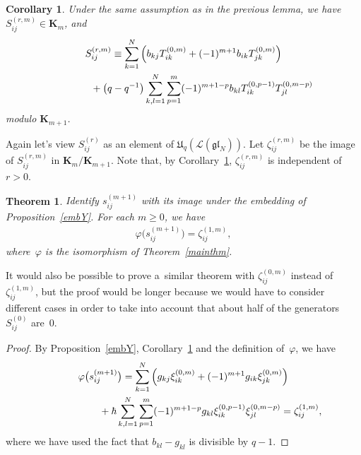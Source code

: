 \documentclass[11pt]{article}
\newtheorem{theorem}{Theorem}
\newtheorem{corollary}{Corollary}
\numberwithin{theorem}{section}
\numberwithin{proposition}{section}
\numberwithin{lemma}{section}
\numberwithin{corollary}{section}
\numberwithin{definition}{section}
\numberwithin{example}{section}
\numberwithin{remark}{section}
\numberwithin{note}{section}
\numberwithin{equation}{section}
\begin{document}
\begin{corollary}
\label{Scong}
Under the same assumption as in the previous lemma, we have $S_{ij}^{(r,m)} \in \mathbf{K}_m$, and
\begin{gather*}
S_{ij}^{(r,m)} \equiv \sum\limits_{k=1}^N \left(b_{kj}T_{ik}^{(0,m)} + (-1)^{m+1} b_{ik} T_{jk}^{(0,m)}\right) \\
\hphantom{S_{ij}^{(r,m)} \equiv}{}
+
\big(q-q^{-1}\big) \sum\limits_{k,l=1}^N \sum\limits_{p=1}^m (-1)^{m+1-p} b_{kl} T_{ik}^{(0,p-1)} T_{jl}^{(0,m-p)}
\end{gather*}
modulo $\mathbf{K}_{m+1}$.
\end{corollary}
Again let's view $S_{ij}^{(r)}$ as an element of $\mathfrak{U}_q(\mathcal{L}(\mathfrak{gl}_N))$.
Let $\zeta_{ij}^{(r,m)}$ be the image of $S_{ij}^{(r,m)}$ in $\mathbf{K}_m/\mathbf{K}_{m+1}$.
Note that, by Corollary~\ref{Scong}, $\zeta_{ij}^{(r,m)}$ is independent of $r>0$.
\begin{theorem}
\label{twUqY}
Identify $s_{ij}^{(m+1)}$ with its image under the embedding of Proposition~{\rm \ref{embY}}.
For each $m \geq 0$, we have
\begin{gather*}
\varphi\big(s_{ij}^{(m+1)}\big)=\zeta_{ij}^{(1,m)},
\end{gather*}
where~$\varphi$ is the isomorphism of Theorem~{\rm \ref{mainthm}}.
\end{theorem}

\begin{remark}
It would also be possible to prove a~similar theorem with $\zeta_{ij}^{(0,m)}$ instead of $\zeta_{ij}^{(1,m)}$, but the
proof would be longer because we would have to consider dif\/ferent cases in order to take into account that about half of
the generators $S_{ij}^{(0)}$ are~$0$.
\end{remark}

\begin{proof}
By Proposition~\ref{embY}, Corollary~\ref{Scong} and the def\/inition of~$\varphi$, we have
\begin{gather*}
\varphi\big(s_{ij}^{(m+1)}\big)=\sum\limits_{k=1}^N \left(g_{kj} \xi_{ik}^{(0,m)} + (-1)^{m+1} g_{ik} \xi_{jk}^{(0,m)}\right)
\\
\hphantom{\varphi\big(s_{ij}^{(m+1)}\big)=}{}
+ \hbar \sum\limits_{k,l=1}^N \sum\limits_{p=1}^m (-1)^{m+1-p} g_{kl} \xi_{ik}^{(0,p-1)} \xi_{jl}^{(0,m-p)}
  = \zeta_{ij}^{(1,m)},
\end{gather*}
where we have used the fact that $b_{kl}-g_{kl}$ is divisible by $q-1$.
\end{proof}
\end{document}
